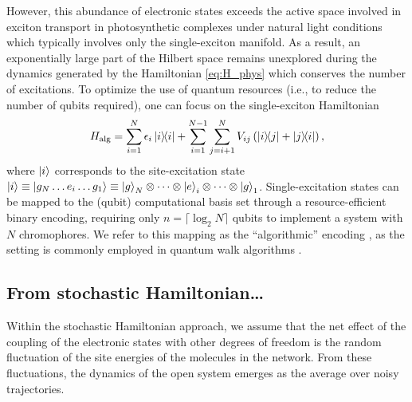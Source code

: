 \documentclass[12pt, amsmath, amssymb, graphicx]{iopart}
\begin{document}
However, this abundance of electronic states exceeds the active space involved in exciton transport in photosynthetic complexes under natural light conditions which typically involves only the single-exciton manifold. As a result, an exponentially large part of the Hilbert space remains unexplored during the dynamics generated by the Hamiltonian \ref{eq:H_phys} which conserves the number of excitations. To optimize the use of quantum resources (i.e., to reduce the number of qubits required), one can focus on the single-exciton Hamiltonian
%
\begin{equation}
    H_{\text{alg}} = \sum_{i=1}^{N} \epsilon_{i} \ketbra{i}{i} + \sum_{i=1}^{N-1} \sum_{j=i+1}^{N} V_{ij} \left( \ketbra{i}{j} + \ketbra{j}{i} \right),
\end{equation}
%
where $\ket{i}$ corresponds to the site-excitation state $\ket{i} \equiv \ket{g_{N} \dots e_{i} \dots g_{1}} \equiv \ket{g}_{N} \otimes \dots \otimes \ket{e}_{i} \otimes \dots \otimes \ket{g}_{1} $. Single-excitation states can be mapped to the (qubit) computational basis set through a resource-efficient binary encoding, requiring only $n = \lceil \log_{2} N \rceil$ qubits to implement a system with $N$ chromophores.
We refer to this mapping as the ``algorithmic'' encoding \cite{Gallina2022}, as the setting is commonly employed in quantum walk algorithms \cite{Hines2007, Shenvi2003}.

\subsection{From stochastic Hamiltonian\dots}

Within the stochastic Hamiltonian approach, we assume that the net effect of the coupling of the electronic states with other degrees of freedom is the random fluctuation of the site energies of the molecules in the network. From these fluctuations, the dynamics of the open system emerges as the average over noisy trajectories.
\end{document}
